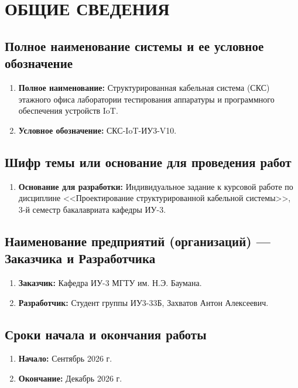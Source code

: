 \documentclass[a4paper,oneside,14pt]{extreport}
\begin{document}
\setcounter{page}{2}


\chapter{ОБЩИЕ СВЕДЕНИЯ}

\section{Полное наименование системы и ее условное обозначение}
\begin{enumerate}[label=\thesection.\arabic*]
    \item \textbf{Полное наименование:} Структурированная кабельная система (СКС) этажного офиса лаборатории тестирования аппаратуры и программного обеспечения устройств IoT.
    \item \textbf{Условное обозначение:} СКС-IoT-ИУ3-V10.
\end{enumerate}

\section{Шифр темы или основание для проведения работ}
\begin{enumerate}[label=\thesection.\arabic*]
    \item \textbf{Основание для разработки:} Индивидуальное задание к курсовой работе по дисциплине <<Проектирование структурированной кабельной системы>>, 3-й семестр бакалавриата кафедры ИУ-3.
\end{enumerate}

\section{Наименование предприятий (организаций) --- Заказчика и Разработчика}
\begin{enumerate}[label=\thesection.\arabic*]
    \item \textbf{Заказчик:} Кафедра ИУ-3 МГТУ им. Н.Э. Баумана.
    \item \textbf{Разработчик:} Студент группы ИУ3-33Б, Захватов Антон Алексеевич.
\end{enumerate}

\section{Сроки начала и окончания работы}
\begin{enumerate}[label=\thesection.\arabic*]
    \item \textbf{Начало:} Сентябрь 2026 г.
    \item \textbf{Окончание:} Декабрь 2026 г.
\end{enumerate}
\end{document}
